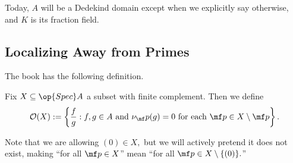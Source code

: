 













Today, $A$ will be a Dedekind domain except when we explicitly say otherwise, and $K$ is its fraction field.

\subsection{Localizing Away from Primes}
The book has the following definition.
\begin{definition}
    Fix $X\subseteq\op{Spec}A$ a subset with finite complement. Then we define
    \[\mathcal O(X):=\left\{\frac fg:f,g\in A\text{ and }\nu_\mf p(g)=0\text{ for each }\mf p\in X\setminus\mf p\right\}.\]
\end{definition}
Note that we are allowing $(0)\in X,$ but we will actively pretend it does not exist, making ``for all $\mf p\in X$'' mean ``for all $\mf p\in X\setminus\{(0)\}.$''

